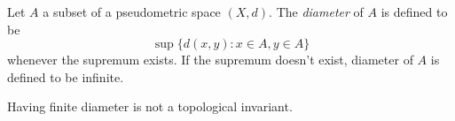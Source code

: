 \documentclass[12pt]{article}
\begin{document}
Let $A$ a subset of a pseudometric space $(X,d)$. The \emph{diameter} of $A$ is defined to be
$$\sup\{d(x,y) : x\in A, y\in A\}$$
whenever the supremum exists. If the supremum doesn't exist, diameter of $A$ is defined to be infinite.

Having finite diameter is not a topological invariant.
\end{document}
